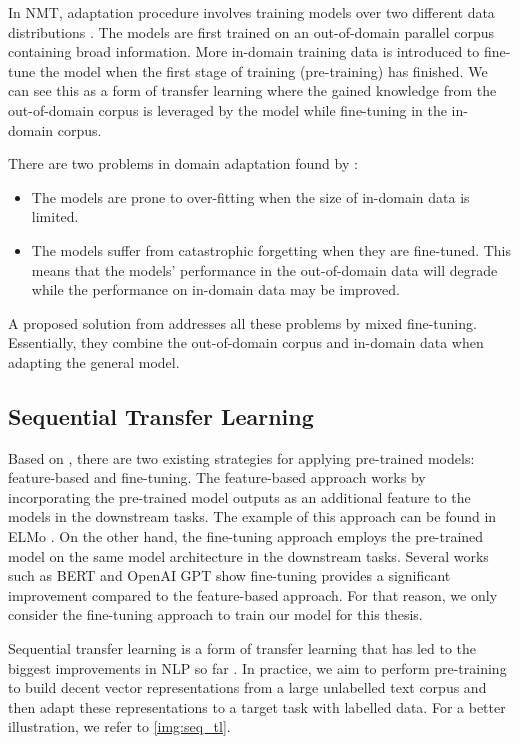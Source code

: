 In NMT, adaptation procedure involves training models over two different data distributions . The models are first trained on an out-of-domain parallel corpus containing broad information. More in-domain training data is introduced to fine-tune the model when the first stage of training (pre-training) has finished. We can see this as a form of transfer learning where the gained knowledge from the out-of-domain corpus is leveraged by the model while fine-tuning in the in-domain corpus.

There are two problems in domain adaptation found by :
\begin{itemize}
    \item The models are prone to over-fitting when the size of in-domain data is limited.
    \item The models suffer from catastrophic forgetting when they are fine-tuned. This means that the models' performance in the out-of-domain data will degrade while the performance on in-domain data may be improved.
\end{itemize}
A proposed solution from  addresses all these problems by mixed fine-tuning. Essentially, they combine the out-of-domain corpus and in-domain data when adapting the general model.

\subsection{Sequential Transfer Learning}
Based on , there are two existing strategies for applying pre-trained models: feature-based and fine-tuning. The feature-based approach works by incorporating the pre-trained model outputs as an additional feature to the models in the downstream tasks. The example of this approach can be found in ELMo . On the other hand, the fine-tuning approach employs the pre-trained model on the same model architecture in the downstream tasks. Several works such as BERT  and OpenAI GPT  show fine-tuning provides a significant improvement compared to the feature-based approach. For that reason, we only consider the fine-tuning approach to train our model for this thesis.

Sequential transfer learning is a form of transfer learning that has led to the biggest improvements in NLP so far . In practice, we aim to perform pre-training to build decent vector representations from a large unlabelled text corpus and then adapt these representations to a target task with labelled data. For a better illustration, we refer to \cref{img:seq_tl}.


